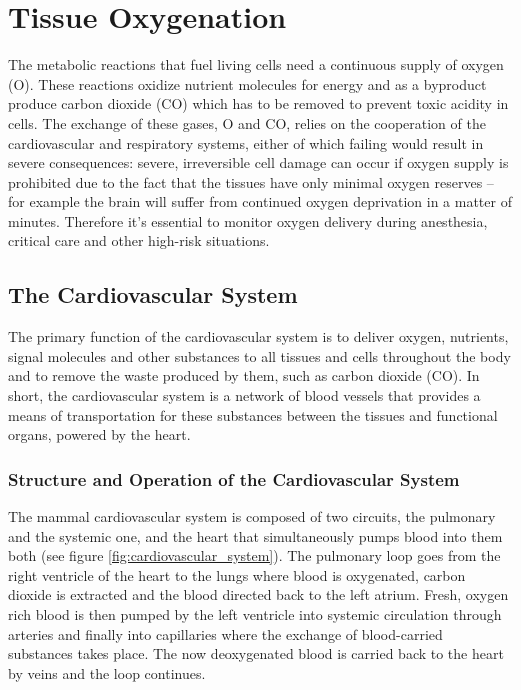 \clearpage
\section{Tissue Oxygenation}

The metabolic reactions that fuel living cells need a continuous supply of oxygen (O). These reactions oxidize nutrient molecules for energy and as a byproduct produce carbon dioxide (CO) which has to be removed to prevent toxic acidity in cells. The exchange of these gases, O and CO, relies on the cooperation of the cardiovascular and respiratory systems, either of which failing would result in severe consequences: severe, irreversible cell damage can occur if oxygen supply is prohibited due to the fact that the tissues have only minimal oxygen reserves -- for example the brain will suffer from continued oxygen deprivation in a matter of minutes. Therefore it's essential to monitor oxygen delivery during anesthesia, critical care and other high-risk situations.\ \cite{Tortora2000}

\subsection{The Cardiovascular System}

The primary function of the cardiovascular system is to deliver oxygen, nutrients, signal molecules and other substances to all tissues and cells throughout the body and to remove the waste produced by them, such as carbon dioxide (CO). In short, the cardiovascular system is a network of blood vessels that provides a means of transportation for these substances between the tissues and functional organs, powered by the heart.\ \cite{Tortora2000}

\subsubsection{Structure and Operation of the Cardiovascular System}

The mammal cardiovascular system is composed of two circuits, the pulmonary and the systemic one, and the heart that simultaneously pumps blood into them both (see figure \ref{fig:cardiovascular_system}). The pulmonary loop goes from the right ventricle of the heart to the lungs where blood is oxygenated, carbon dioxide is extracted and the blood directed back to the left atrium. Fresh, oxygen rich blood is then pumped by the left ventricle into systemic circulation through arteries and finally into capillaries where the exchange of blood-carried substances takes place. The now deoxygenated blood is carried back to the heart by veins and the loop continues.

